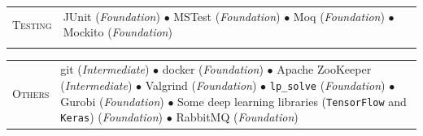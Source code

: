 \documentclass[english,10pt,a4paper]{article}
\newcommand{\BasicLevel}{{\footnotesize (\textit{Foundation})}}
\newcommand{\MediumLevel}{{\footnotesize (\textit{Intermediate})}}
\newcommand{\CvBullet}{\hspace{0.05cm} \textcolor{CvColor}{$\bullet$} \hspace{0.05cm}}
\newcommand{\CvDate}[1]{\textcolor{CvColor}{{\textsc{#1}}}}
\def\SidebarHSize{3.95cm}
\def\BodyHSize{12.5cm}
\begin{document}
		\begin{tabular}{p{\SidebarHSize}p{\BodyHSize}}
			\CvDate{Testing} & JUnit \BasicLevel \CvBullet MSTest \BasicLevel \CvBullet Moq \BasicLevel \CvBullet Mockito \BasicLevel \\\\
		\end{tabular}
		
		\begin{tabular}{p{\SidebarHSize}p{\BodyHSize}}
			\CvDate{Others} & git \MediumLevel \CvBullet docker \BasicLevel \CvBullet Apache ZooKeeper \MediumLevel \CvBullet Valgrind \BasicLevel \CvBullet \texttt{lp\_solve} \BasicLevel \CvBullet  Gurobi \BasicLevel \CvBullet Some deep learning libraries (\texttt{TensorFlow} and \texttt{Keras}) \BasicLevel \CvBullet RabbitMQ \BasicLevel \\
		\end{tabular}
		
	
	
	

	
	
	
	
	
\end{document}
